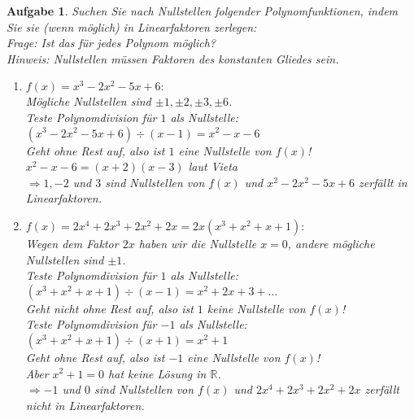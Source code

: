 \documentclass[12pt]{article}
\newtheorem{exercise}[satz]{Aufgabe}
\begin{document}
   \vspace{2cm}

  \begin{exercise}
  Suchen Sie nach Nullstellen folgender Polynomfunktionen, indem Sie sie (wenn m\"oglich) in Linearfaktoren zerlegen:\\
  Frage: Ist das f\"ur jedes Polynom m\"oglich?\\
  Hinweis: Nullstellen m\"ussen Faktoren des konstanten Gliedes sein.
  \begin{enumerate}
  \item[(a)] $f(x) = x^3-2x^2-5x+6:$ \\
             M\"ogliche Nullstellen sind $\pm1,\pm2,\pm3,\pm6$.\\
             Teste Polynomdivision f\"ur $1$ als Nullstelle: \\
             $(x^3-2x^2-5x+6)\div(x-1)=x^2-x-6$\\
             Geht ohne Rest auf, also ist $1$ eine Nullstelle von $f(x)$!\\
             $x^2-x-6=(x+2)(x-3)$ laut Vieta\\
             $\Rightarrow 1,-2$ und $3$ sind Nullstellen von $f(x)$ und $x^2-2x^2-5x+6$ zerf\"allt in Linearfaktoren.
  \item[(b)] $f(x) = 2x^4+2x^3+2x^2+2x = 2x(x^3+x^2+x+1):$ \\
             Wegen dem Faktor $2x$ haben wir die Nullstelle $x=0$,
             andere m\"ogliche Nullstellen sind $\pm1$.\\
             Teste Polynomdivision f\"ur $1$ als Nullstelle: \\
             $(x^3+x^2+x+1)\div(x-1)=x^2+2x+3+\ldots$\\
             Geht nicht ohne Rest auf, also ist $1$ keine Nullstelle von $f(x)$!\\
             Teste Polynomdivision f\"ur $-1$ als Nullstelle: \\
             $(x^3+x^2+x+1)\div(x+1)=x^2+1$\\
             Geht ohne Rest auf, also ist $-1$ eine Nullstelle von $f(x)$!\\
             Aber $x^2+1=0$ hat keine L\"osung in $\mathbb{R}$.\\
             $\Rightarrow -1$ und $0$ sind Nullstellen von $f(x)$ und $2x^4+2x^3+2x^2+2x$ zerf\"allt nicht in Linearfaktoren. 
  \end{enumerate}
   \end{exercise}
   
\end{document}
